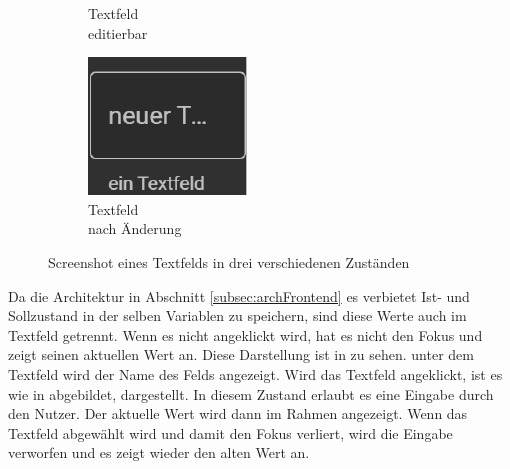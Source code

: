 \begin{figure}[ht]
\begin{subfigure}[h]{0.24\textwidth}
    \caption{Textfeld \\editierbar}
    \label{fig:frontend:poc:textFeld:focus}
  \end{subfigure}
  \hfill
  \begin{subfigure}[h]{0.24\textwidth}
    \centering
    \includegraphics[width=\textwidth]{content/hauptteil/umsetzungPoC/frontend/res/TextfeldNeuerText.pdf}
    \caption{Textfeld \\nach Änderung}
    \label{fig:frontend:poc:textFeld:nachAenderung}
  \end{subfigure}
  \hspace{0.05\textwidth}
  \caption[Screenshot, Zustände eines Textfelds]{Screenshot eines Textfelds in drei verschiedenen Zuständen}
  \label{fig:frontend:poc:textFeld}
\end{figure}
Da die Architektur in Abschnitt \ref{subsec:archFrontend} es verbietet Ist- und Sollzustand in der selben Variablen zu speichern, sind diese Werte auch im Textfeld getrennt.
Wenn es nicht angeklickt wird, hat es nicht den Fokus und zeigt seinen aktuellen Wert an. 
Diese Darstellung ist in  zu sehen. unter dem Textfeld wird der Name des Felds angezeigt.
Wird das Textfeld angeklickt, ist es wie in  abgebildet, dargestellt. In diesem Zustand erlaubt es eine Eingabe durch den Nutzer.
Der aktuelle Wert wird dann im Rahmen angezeigt. 
Wenn das Textfeld abgewählt wird und damit den Fokus verliert, wird die Eingabe verworfen und es zeigt wieder den alten Wert an.
